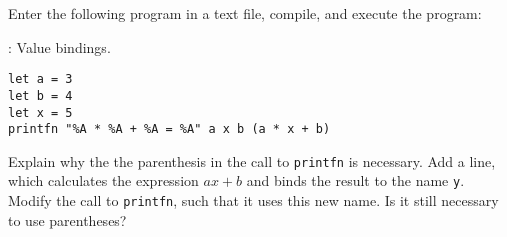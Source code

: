 Enter the following program in a text file, compile, and execute the program:
  \begin{codeNOutput}[label=linear]{: Value bindings.}
\begin{lstlisting}
let a = 3
let b = 4
let x = 5
printfn "%A * %A + %A = %A" a x b (a * x + b)
\end{lstlisting}
\end{codeNOutput}
Explain why the the parenthesis in the call to \lstinline!printfn! is
necessary. Add a line, which calculates the expression $ax+b$ and
binds the result to the name \lstinline!y!. Modify the call to
\lstinline!printfn!, such that it uses this new name. Is it still
necessary to use parentheses?
